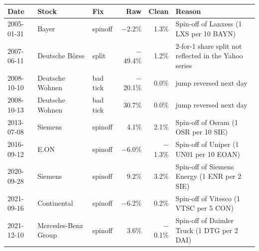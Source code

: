 \begin{tabular}{lllrrp{5.2cm}}
\toprule
Date & Stock & Fix & Raw & Clean & Reason \\
\midrule
2005-01-31 & Bayer & spinoff & $-$2.2\% & 1.3\% & Spin-off of Lanxess (1 LXS per 10 BAYN) \\
2007-06-11 & Deutsche Börse & split & $-$49.4\% & 1.2\% & 2-for-1 share split not reflected in the Yahoo series \\
2008-10-10 & Deutsche Wohnen & bad tick & $-$20.1\% & 0.0\% & jump reversed next day \\
2008-10-13 & Deutsche Wohnen & bad tick & 30.7\% & 0.0\% & jump reversed next day \\
2013-07-08 & Siemens & spinoff & 4.1\% & 2.1\% & Spin-off of Osram (1 OSR per 10 SIE) \\
2016-09-12 & E.ON & spinoff & $-$6.0\% & $-$1.3\% & Spin-off of Uniper (1 UN01 per 10 EOAN) \\
2020-09-28 & Siemens & spinoff & 9.2\% & 3.2\% & Spin-off of Siemens Energy (1 ENR per 2 SIE) \\
2021-09-16 & Continental & spinoff & $-$6.2\% & 0.2\% & Spin-off of Vitesco (1 VTSC per 5 CON) \\
2021-12-10 & Mercedes-Benz Group & spinoff & 3.6\% & $-$0.1\% & Spin-off of Daimler Truck (1 DTG per 2 DAI) \\
\bottomrule
\end{tabular}
